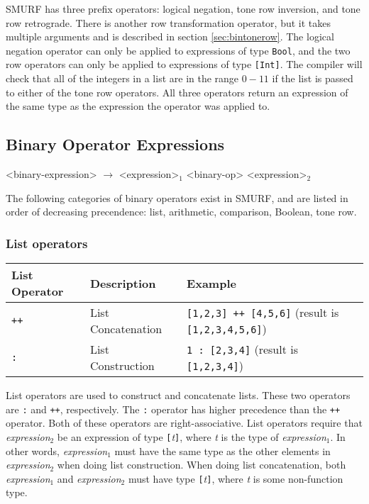 SMURF has three prefix operators: logical negation, tone row inversion, and tone row retrograde.
There is another row transformation operator, but it takes multiple arguments and is described in
section \ref{sec:bintonerow}. The logical negation operator can only be applied to expressions of
type \texttt{Bool}, and the two row operators can only be applied to expressions of type
\texttt{[Int]}. The compiler will check that all of the integers in a list are in the range $0-11$
if the list is passed to either of the tone row operators.
All three operators return an expression of the same type as the expression the
operator was applied to.

\subsection{Binary Operator Expressions}
\label{sec:binops}
\begin{grammar}
<binary-expression> $\rightarrow$ <expression>$_1$ <binary-op> <expression>$_2$
\end{grammar}
The following categories of binary operators exist in SMURF, and are listed in order of decreasing
precendence: list, arithmetic, comparison, Boolean, tone row. 

\subsubsection{List operators}

\begin{table} [H]
\centering
\begin{tabular}{lll}
\hline\hline
List Operator & Description & Example \\
\hline\hline
   \texttt{++} & List Concatenation & \texttt{[1,2,3] ++ [4,5,6]} (result is \texttt{[1,2,3,4,5,6]}) \\ \hline
   \texttt{:} & List Construction & \texttt{1 : [2,3,4]} (result is \texttt{[1,2,3,4]}) \\ \hline
\end{tabular}
\end{table}

List operators are used to construct and concatenate lists. 
These two operators are \texttt{:} and \texttt{++}, respectively. The \texttt{:} operator has 
higher precedence than the \texttt{++} operator. Both of these operators are right-associative.
List operators require that  \emph{expression$_{2}$} be an expression of type 
\texttt{[}\emph{t}\texttt{]}, where \emph{t} is the type of \emph{expression$_{1}$}. 
In other words, \emph{expression$_{1}$} must have the same type 
as the other elements in \emph{expression$_{2}$} when doing list construction.
When doing list concatenation, both
\emph{expression$_{1}$} and \emph{expression$_{2}$} must have type \texttt{[}\emph{t}\texttt{]},
where \emph{t} is some non-function type. 

